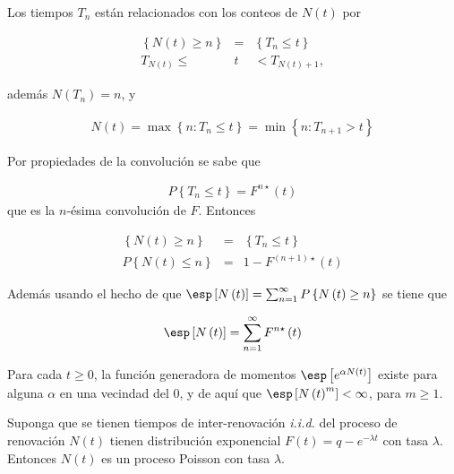 Los tiempos $T_{n}$ est\'an relacionados con los conteos de $N\left(t\right)$ por

\begin{eqnarray*}
\left\{N\left(t\right)\geq n\right\}&=&\left\{T_{n}\leq t\right\}\\
T_{N\left(t\right)}\leq &t&<T_{N\left(t\right)+1},
\end{eqnarray*}

adem\'as $N\left(T_{n}\right)=n$, y 

\begin{eqnarray*}
N\left(t\right)=\max\left\{n:T_{n}\leq t\right\}=\min\left\{n:T_{n+1}>t\right\}
\end{eqnarray*}

Por propiedades de la convoluci\'on se sabe que

\begin{eqnarray*}
P\left\{T_{n}\leq t\right\}=F^{n\star}\left(t\right)
\end{eqnarray*}
que es la $n$-\'esima convoluci\'on de $F$. Entonces 

\begin{eqnarray*}
\left\{N\left(t\right)\geq n\right\}&=&\left\{T_{n}\leq t\right\}\\
P\left\{N\left(t\right)\leq n\right\}&=&1-F^{\left(n+1\right)\star}\left(t\right)
\end{eqnarray*}

Adem\'as usando el hecho de que $\esp\left[N\left(t\right)\right]=\sum_{n=1}^{\infty}P\left\{N\left(t\right)\geq n\right\}$
se tiene que

\begin{eqnarray*}
\esp\left[N\left(t\right)\right]=\sum_{n=1}^{\infty}F^{n\star}\left(t\right)
\end{eqnarray*}

\begin{Prop}
Para cada $t\geq0$, la funci\'on generadora de momentos $\esp\left[e^{\alpha N\left(t\right)}\right]$ existe para alguna $\alpha$ en una vecindad del 0, y de aqu\'i que $\esp\left[N\left(t\right)^{m}\right]<\infty$, para $m\geq1$.
\end{Prop}

\begin{Ejem}

Suponga que se tienen tiempos de inter-renovaci\'on \textit{i.i.d.} del proceso de renovaci\'on $N\left(t\right)$ tienen distribuci\'on exponencial $F\left(t\right)=q-e^{-\lambda t}$ con tasa $\lambda$. Entonces $N\left(t\right)$ es un proceso Poisson con tasa $\lambda$.

\end{Ejem}


